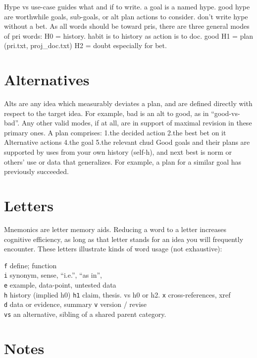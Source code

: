 \documentclass[
]{book}
\begin{document}
Hype vs use-case guides what and if to write. a goal is a named hype. good hype are worthwhile goals, sub-goals, or alt plan actions to consider. don't write hype without a bet.
As all words should be toward pris, there are three general modes of pri words:
H0 = history. habit is to history as action is to doc. good
H1 = plan (pri.txt, proj\_doc.txt)
H2 = doubt especially for bet.

\hypertarget{word-alternatives}{%
\section{Alternatives}\label{word-alternatives}}

Alts are any idea which measurably deviates a plan, and are defined directly with respect to the target idea.
For example, bad is an alt to good, as in ``good-vs-bad''.
Any other valid modes, if at all, are in support of maximal revision in these primary ones.
A plan comprises: 1.the decided action 2.the best bet on it
Alternative actions 4.the goal 5.the relevant chud
Good goals and their plans are supported by uses from your own history (self-h), and next best is norm or others' use or data that generalizes.
For example, a plan for a similar goal has previously succeeded.

\hypertarget{letters}{%
\section{Letters}\label{letters}}

Mnemonics are letter memory aids.
Reducing a word to a letter increases cognitive efficiency, as long as that letter stands for an idea you will frequently encounter.
These letters illustrate kinds of word usage (not exhaustive):

\texttt{f} define; function\\
\texttt{i} synonym, sense, ``i.e.'', ``as in'',\\
\texttt{e} example, data-point, untested data\\
\texttt{h} history (implied h0)
\texttt{h1} claim, thesis. vs h0 or h2.
\texttt{x} cross-references, xref\\
\texttt{d} data or evidence, summary
\texttt{v} version / revise\\
\texttt{vs} an alternative, sibling of a shared parent category.

\hypertarget{notes}{%
\section{Notes}\label{notes}}
\end{document}
